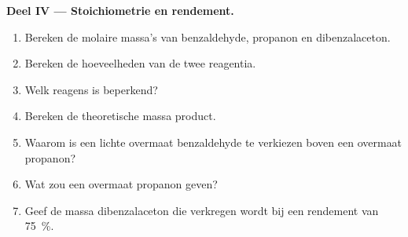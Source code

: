\begin{problem}
\medskip
\noindent\textbf{Deel IV --- Stoichiometrie en rendement.}
\begin{enumerate}[resume]
  \item Bereken de molaire massa's van benzaldehyde, propanon en dibenzalaceton.
  \item Bereken de hoeveelheden van de twee reagentia.
  \item Welk reagens is beperkend?
  \item Bereken de theoretische massa product.
  \item Waarom is een lichte overmaat benzaldehyde te verkiezen boven een overmaat propanon?
  \item Wat zou een overmaat propanon geven?
  \item Geef de massa dibenzalaceton die verkregen wordt bij een rendement van 75~\%.
\end{enumerate}
\end{problem}
